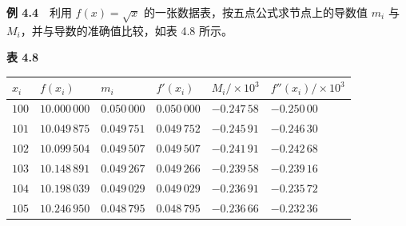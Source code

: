 \documentclass[
  10pt,
  fontset=fandol]{ctexart}
\newcounter{none} %
\begin{document}
\textbf{例 4.4}　利用 \(f(x)=\sqrt{x}\) 的一张数据表，按五点公式求节点上的导数值 \(m_i\) 与 \(M_i\)，并与导数的准确值比较，如表 4.8 所示。

\textbf{表 4.8}

{\def\LTcaptype{none} %
\begin{longtable}[]{@{}
  >{\raggedleft\arraybackslash}p{}
  >{\raggedleft\arraybackslash}p{}
  >{\raggedleft\arraybackslash}p{}
  >{\raggedleft\arraybackslash}p{}
  >{\raggedleft\arraybackslash}p{}
  >{\raggedleft\arraybackslash}p{}@{}}
\toprule\noalign{}
\begin{minipage}[b]{\linewidth}\raggedleft
\(x_i\)
\end{minipage} & \begin{minipage}[b]{\linewidth}\raggedleft
\(f(x_i)\)
\end{minipage} & \begin{minipage}[b]{\linewidth}\raggedleft
\(m_i\)
\end{minipage} & \begin{minipage}[b]{\linewidth}\raggedleft
\(f'(x_i)\)
\end{minipage} & \begin{minipage}[b]{\linewidth}\raggedleft
\(M_i/\times10^3\)
\end{minipage} & \begin{minipage}[b]{\linewidth}\raggedleft
\(f''(x_i)/\times10^3\)
\end{minipage} \\
\midrule\noalign{}
\endhead
\bottomrule\noalign{}
\endlastfoot
\(100\) & \(10.000\,000\) & \(0.050\,000\) & \(0.050\,000\) & \(-0.247\,58\) & \(-0.250\,00\) \\
\(101\) & \(10.049\,875\) & \(0.049\,751\) & \(0.049\,752\) & \(-0.245\,91\) & \(-0.246\,30\) \\
\(102\) & \(10.099\,504\) & \(0.049\,507\) & \(0.049\,507\) & \(-0.241\,91\) & \(-0.242\,68\) \\
\(103\) & \(10.148\,891\) & \(0.049\,267\) & \(0.049\,266\) & \(-0.239\,58\) & \(-0.239\,16\) \\
\(104\) & \(10.198\,039\) & \(0.049\,029\) & \(0.049\,029\) & \(-0.236\,91\) & \(-0.235\,72\) \\
\(105\) & \(10.246\,950\) & \(0.048\,795\) & \(0.048\,795\) & \(-0.236\,66\) & \(-0.232\,36\) \\
\end{longtable}
}
\end{document}
